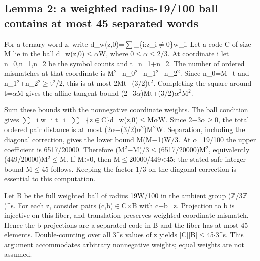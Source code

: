 \documentclass[11pt,a4paper]{article}
\begin{document}
\subsection{Lemma 2: a weighted radius-19/100 ball contains at most 45 separated words}
For a ternary word z, write d\_w(z,0)=\ensuremath{\sum}\_\{i:z\_i\ensuremath{\neq}0\}w\_i. Let a code C of size M lie in the ball d\_w(z,0)\ensuremath{\leq}\ensuremath{\alpha}W, where 0\ensuremath{\leq}\ensuremath{\alpha}\ensuremath{\leq}2/3. At coordinate i let n\_0,n\_1,n\_2 be the symbol counts and t=n\_1+n\_2. The number of ordered mismatches at that coordinate is M\ensuremath{^2}\ensuremath{-}n\_0\ensuremath{^2}\ensuremath{-}n\_1\ensuremath{^2}\ensuremath{-}n\_2\ensuremath{^2}. Since n\_0=M\ensuremath{-}t and n\_1\ensuremath{^2}+n\_2\ensuremath{^2}\ensuremath{\geq}t\ensuremath{^2}/2, this is at most 2Mt\ensuremath{-}(3/2)t\ensuremath{^2}. Completing the square around t=\ensuremath{\alpha}M gives the affine tangent bound (2\ensuremath{-}3\ensuremath{\alpha})Mt+(3/2)\ensuremath{\alpha}\ensuremath{^2}M\ensuremath{^2}.

Sum these bounds with the nonnegative coordinate weights. The ball condition gives \ensuremath{\sum}\_i w\_i t\_i=\ensuremath{\sum}\_\{z\ensuremath{\in}C\}d\_w(z,0)\ensuremath{\leq}M\ensuremath{\alpha}W. Since 2\ensuremath{-}3\ensuremath{\alpha}\ensuremath{\geq}0, the total ordered pair distance is at most (2\ensuremath{\alpha}\ensuremath{-}(3/2)\ensuremath{\alpha}\ensuremath{^2})M\ensuremath{^2}W. Separation, including the diagonal correction, gives the lower bound M(M\ensuremath{-}1)W/3. At \ensuremath{\alpha}=19/100 the upper coefficient is 6517/20000. Therefore (M\ensuremath{^2}\ensuremath{-}M)/3\ensuremath{\leq}(6517/20000)M\ensuremath{^2}, equivalently (449/20000)M\ensuremath{^2}\ensuremath{\leq}M. If M>0, then M\ensuremath{\leq}20000/449<45; the stated safe integer bound M\ensuremath{\leq}45 follows. Keeping the factor 1/3 on the diagonal correction is essential to this computation.

Let B be the full weighted ball of radius 19W/100 in the ambient group (\ensuremath{\mathbb{Z}}/3\ensuremath{\mathbb{Z}})\textasciicircum{}s. For each z, consider pairs (c,b)\ensuremath{\in}C\ensuremath{\times}B with c+b=z. Projection to b is injective on this fiber, and translation preserves weighted coordinate mismatch. Hence the b-projections are a separated code in B and the fiber has at most 45 elements. Double-counting over all 3\textasciicircum{}s values of z yields |C||B|\ensuremath{\leq}45\ensuremath{\cdot}3\textasciicircum{}s. This argument accommodates arbitrary nonnegative weights; equal weights are not assumed.
\end{document}
